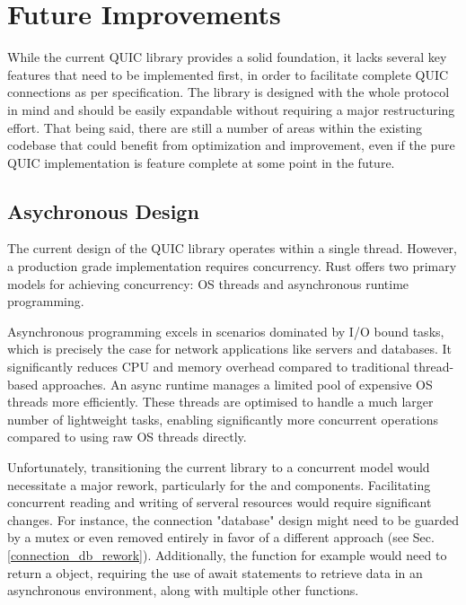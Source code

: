 \section{Future Improvements}

While the current QUIC library provides a solid foundation, it lacks several key features that need to be implemented first, in
order to facilitate complete QUIC connections as per specification. The library is designed with the whole protocol in mind and
should be easily expandable without requiring a major restructuring effort. That being said, there are still a number of areas
within the existing codebase that could benefit from optimization and improvement, even if the pure QUIC implementation is
feature complete at some point in the future.

\subsection{Asychronous Design}

The current design of the QUIC library operates within a single thread. However, a production grade implementation requires
concurrency. Rust offers two primary models for achieving concurrency: OS threads and asynchronous runtime programming.

Asynchronous programming excels in scenarios dominated by I/O bound tasks, which is precisely the case for network applications
like servers and databases. It significantly reduces CPU and memory overhead compared to traditional thread-based approaches.
An async runtime manages a limited pool of expensive OS threads more efficiently. These threads are optimised to handle a much larger
number of lightweight tasks, enabling significantly more concurrent operations compared to using raw OS threads directly.

Unfortunately, transitioning the current library to a concurrent model would necessitate a major rework, particularly for the
 and  components. Facilitating concurrent reading and writing of serveral resources 
would require significant changes. For instance, the connection "database" design might need to be guarded by a mutex or even
removed entirely in favor of a different approach (see Sec. \ref{connection_db_rework}).
Additionally, the  function for example would need to return a  object, requiring
the use of await statements to retrieve data in an asynchronous environment, along with multiple other functions.

